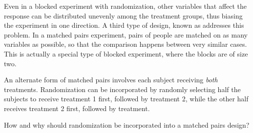 \D{\newpage}

Even in a blocked experiment with randomization, other variables that affect the response can be distributed unevenly among the treatment groups, thus biasing the experiment in one direction. A third type of design, known as  addresses this problem. In a matched pairs experiment, pairs of people are matched on as many variables as possible, so that the comparison happens between very similar cases. This is actually a special type of blocked experiment, where the blocks are of size two.

An alternate form of matched pairs involves each subject receiving \emph{both} treatments. Randomization can be incorporated by randomly selecting half the subjects to receive treatment 1 first, followed by treatment 2, while the other half receives treatment 2 first, followed by treatment.

\begin{exercisewrap}
\begin{nexercise}
How and why should randomization be incorporated into a matched pairs design?\footnotemark
\end{nexercise}
\end{exercisewrap}


